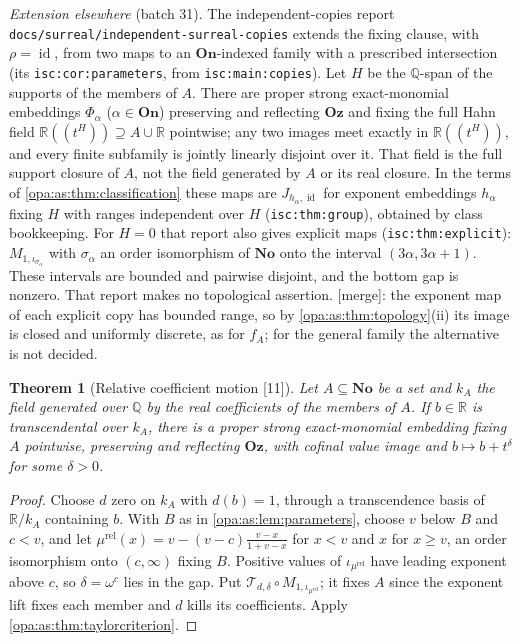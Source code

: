 \documentclass[11pt,oneside]{article}
\numberwithin{equation}{section}
\newtheorem{theorem}{Theorem}[section]
\theoremstyle{definition}
\theoremstyle{remark}
\newcommand{\No}{\mathbf{No}}
\newcommand{\Oz}{\mathbf{Oz}}
\newcommand{\R}{\mathbb R}
\newcommand{\Q}{\mathbb Q}
\newcommand{\id}{\operatorname{id}}
\newcommand{\Hahn}[2]{#1((t^{#2}))}
\newcommand{\src}[1]{\textup{\textsf{\small[#1]}}}
\newcommand{\mergetag}{\textup{\textsf{\small[merge]}}}
\newcommand{\lbl}[1]{\nolinkurl{#1}}
\newcommand{\fn}[1]{\nolinkurl{#1}}
\newcommand{\On}{\mathbf{On}}
\begin{document}
\emph{Extension elsewhere} (batch 31). The independent-copies report \fn{docs/surreal/independent-surreal-copies}
extends the fixing clause, with $\rho=\id$, from two maps to an $\On$-indexed family with a prescribed intersection
(its \lbl{isc:cor:parameters}, from \lbl{isc:main:copies}). Let $H$ be the $\Q$-span of the supports of the members of
$A$. There are proper strong exact-monomial embeddings $\Phi_\alpha$ ($\alpha\in\On$) preserving and reflecting $\Oz$
and fixing the full Hahn field $\Hahn\R H\supseteq A\cup\R$ pointwise; any two images meet exactly in $\Hahn\R H$, and
every finite subfamily is jointly linearly disjoint over it. That field is the full support closure of $A$, not the
field generated by $A$ or its real closure. In the terms of \cref{opa:as:thm:classification} these maps are
$J_{h_\alpha,\id}$ for exponent embeddings $h_\alpha$ fixing $H$ with ranges independent over $H$
(\lbl{isc:thm:group}), obtained by class bookkeeping. For $H=0$ that report also gives explicit maps
(\lbl{isc:thm:explicit}): $M_{1,\iota_{\sigma_\alpha}}$ with $\sigma_\alpha$ an order isomorphism of $\No$ onto the
interval $(3\alpha,3\alpha+1)$. These intervals are bounded and pairwise disjoint, and the bottom gap is nonzero. That
report makes no topological assertion. \mergetag: the exponent map of each explicit copy has bounded range, so by
\cref{opa:as:thm:topology}(ii) its image is closed and uniformly discrete, as for $f_A$; for the general family the
alternative is not decided.

\begin{theorem}[Relative coefficient motion \src{11}]\label{opa:as:thm:relative}
Let $A\subseteq\No$ be a set and $k_A$ the field generated over $\Q$ by the real coefficients of the members of $A$.
If $b\in\R$ is transcendental over $k_A$, there is a proper strong exact-monomial embedding fixing $A$ pointwise,
preserving and reflecting $\Oz$, with cofinal value image and $b\mapsto b+t^\delta$ for some $\delta>0$.
\end{theorem}
\begin{proof}
Choose $d$ zero on $k_A$ with $d(b)=1$, through a transcendence basis of $\R/k_A$ containing $b$. With $B$ as in
\cref{opa:as:lem:parameters}, choose $v$ below $B$ and $c<v$, and let $\mu^{\mathrm{rel}}(x)=v-(v-c)\frac{v-x}{1+v-x}$
for $x<v$ and $x$ for $x\ge v$, an order isomorphism onto $(c,\infty)$ fixing $B$. Positive values of
$\iota_{\mu^{\mathrm{rel}}}$ have leading exponent above $c$, so $\delta=\omega^c$ lies in the gap. Put
$\mathcal T_{d,\delta}\circ M_{1,\iota_{\mu^{\mathrm{rel}}}}$; it fixes $A$ since the exponent lift fixes each member
and $d$ kills its coefficients. Apply \cref{opa:as:thm:taylorcriterion}.
\end{proof}
\end{document}
